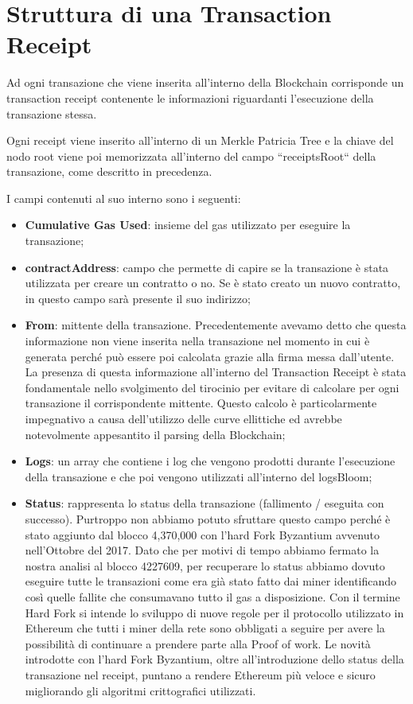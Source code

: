 \documentclass[12pt]{report}
\begin{document}
\newpage
\section{Struttura di una Transaction Receipt}

Ad ogni transazione che viene inserita all'interno della Blockchain corrisponde  un transaction receipt contenente le informazioni riguardanti l'esecuzione della transazione stessa.

Ogni receipt viene inserito all'interno di un Merkle Patricia Tree e la chiave del nodo root viene poi memorizzata all'interno del campo ``receiptsRoot`` della transazione, come descritto in precedenza.

I campi contenuti al suo interno sono i seguenti:

\begin{itemize}
\item \textbf{Cumulative Gas Used}: insieme del gas utilizzato per eseguire la transazione;
\item \textbf{contractAddress}: campo che permette di capire se la transazione è stata utilizzata per creare un contratto o no. Se è stato creato un nuovo contratto, in questo campo sarà presente il suo indirizzo;
\item \textbf{From}: mittente della transazione. Precedentemente avevamo detto che questa informazione non viene inserita nella transazione nel momento in cui è generata perché può essere poi calcolata grazie alla firma messa dall'utente. La presenza di questa informazione all'interno del Transaction Receipt è stata fondamentale nello svolgimento del tirocinio per evitare di calcolare per ogni transazione il corrispondente mittente. Questo calcolo è particolarmente impegnativo a causa dell'utilizzo delle curve ellittiche ed avrebbe notevolmente appesantito il parsing della Blockchain;
\item \textbf{Logs}: un array che contiene i log che vengono prodotti durante l'esecuzione della transazione e che poi vengono utilizzati all'interno del logsBloom;
\item \textbf{Status}: rappresenta lo status della transazione (fallimento / eseguita con successo).
Purtroppo non abbiamo potuto sfruttare questo campo perché è stato aggiunto dal blocco 4,370,000 con l'hard Fork Byzantium \cite{Byzantium} avvenuto nell'Ottobre del 2017.
Dato che per motivi di tempo abbiamo fermato la nostra analisi al blocco 4227609, per recuperare lo status abbiamo dovuto eseguire tutte le transazioni come era già stato fatto dai miner identificando così quelle fallite che consumavano tutto il gas a disposizione.
Con il termine Hard Fork si intende lo sviluppo di nuove regole per il protocollo utilizzato in Ethereum che tutti i miner della rete sono obbligati a seguire per avere la possibilità di continuare a prendere parte alla Proof of work.
Le novità introdotte con l'hard Fork Byzantium, oltre all'introduzione dello status della transazione nel receipt, puntano a rendere Ethereum più veloce e sicuro migliorando gli algoritmi crittografici utilizzati.

\end{itemize}
\end{document}
